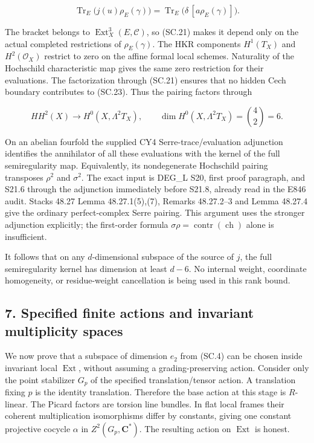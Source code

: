 \[
 \operatorname{Tr}_E\bigl(j(u)\rho_E(\gamma)\bigr)
   =\operatorname{Tr}_E\bigl(\delta\,[a\rho_E(\gamma)]\bigr).
 \tag{SC.23}
\]

The bracket belongs to \(\operatorname{Ext}^3_X(E,\mathcal C)\), so (SC.21) makes it depend
only on the actual completed restrictions of \(\rho_E(\gamma)\). The HKR
components \(H^1(T_X)\) and \(H^2(\mathcal O_X)\) restrict to zero on the affine formal
local schemes. Naturality of the Hochschild characteristic map gives
the same zero restriction for their evaluations. The factorization
through (SC.21) ensures that no hidden Cech boundary contributes to
(SC.23). Thus the pairing factors through

\[
 HH^2(X)\longrightarrow H^0(X,\Lambda^2T_X),
 \qquad \dim H^0(X,\Lambda^2T_X)=\binom42=6.
 \tag{SC.24}
\]

On an abelian fourfold the supplied CY4 Serre-trace/evaluation adjunction
identifies the annihilator of all these evaluations with the kernel of
the full semiregularity map. Equivalently, its nondegenerate Hochschild
pairing transposes \(\rho^2\) and \(\sigma^2\). The exact input is DEG\_L S20,
first proof paragraph, and S21.6 through the adjunction immediately
before S21.8, already read in the E846 audit. Stacks 48.27 Lemma 48.27.1(5),(7),
Remarks 48.27.2--3 and Lemma 48.27.4\cite{SFStacksE846Duality} give the ordinary perfect-complex
Serre pairing. This argument uses the stronger adjunction explicitly;
the first-order formula \(\sigma\rho=\operatorname{contr}(\operatorname{ch})\) alone is insufficient.

It follows that on any \(d\)-dimensional subspace of the source of \(j\),
the full semiregularity kernel has dimension at least \(d-6\). No internal
weight, coordinate homogeneity, or residue-weight cancellation is
being used in this rank bound.

\subsection{7. Specified finite actions and invariant multiplicity spaces}\label{SF-E847:s7}

We now prove that a subspace of dimension \(e_2\) from (SC.4) can be chosen
inside invariant local \(\operatorname{Ext}\), without assuming a grading-preserving action.
Consider only the point stabilizer \(G_p\) of the specified translation/tensor
action. A translation fixing \(p\) is the identity translation. Therefore
the base action at this stage is \(R\)-linear. The Picard factors are torsion
line bundles. In flat local frames their coherent multiplication
isomorphisms differ by constants, giving one constant projective cocycle
\(\alpha\) in \(Z^2(G_p,\mathbf C^*)\). The resulting action on \(\operatorname{Ext}\) is honest.

